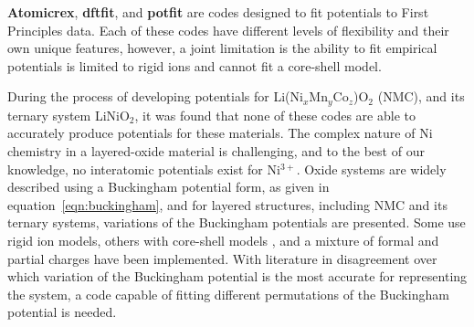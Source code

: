 \documentclass[../main.tex]{subfiles}
\begin{document}
\textbf{Atomicrex}, \cite{Stukowski_2017} \textbf{dftfit}, \cite{dftfit} and \textbf{potfit} \cite{wen_kim-compliant_2017, potfit} are codes designed to fit potentials to First Principles data. Each of these codes have different levels of flexibility and their own unique features, however, a joint limitation is the ability to fit empirical potentials is limited to rigid ions and cannot fit a core-shell model.

During the process of developing potentials for Li(Ni$_x$Mn$_y$Co$_z$)O$_2$ (NMC), and its ternary system LiNiO$_2$, it was found that none of these codes are able to accurately produce potentials for these materials. The complex nature of Ni chemistry in a layered-oxide material is challenging, and to the best of our knowledge, no interatomic potentials exist for Ni$^{3+}$. Oxide systems are widely described using a Buckingham potential form, as given in equation~\ref{eqn:buckingham}, and for layered structures, including NMC and its ternary systems, variations of the Buckingham potentials are presented. Some use rigid ion models,\cite{Lewis_1985, Ledwaba2020, Sayle2005, Dawson0214} others with core-shell models \cite{Hart1998, Fisher2010, Lewis_1985,Ammundsen1999, Kerisit2014, He2019,lee2012atomistic}, and a mixture of formal and partial charges have been implemented. With literature in disagreement over which variation of the Buckingham potential is the most accurate for representing the system, a code capable of fitting different permutations of the Buckingham potential is needed.
\end{document}
